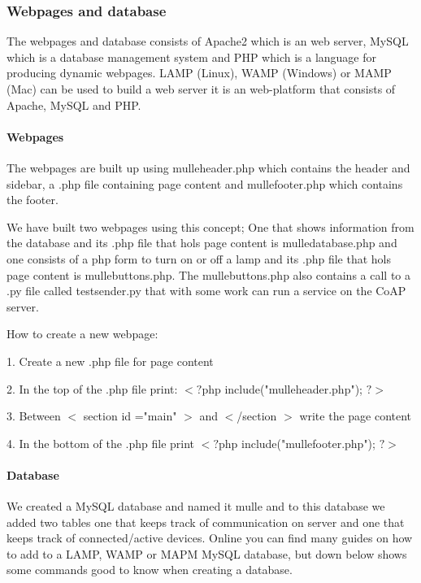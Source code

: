 \subsubsection{Webpages and database}
 
The webpages and database consists of Apache2 which is an web server, MySQL which is a database management system and PHP which is a language for producing dynamic webpages.
LAMP (Linux), WAMP (Windows) or MAMP (Mac) can be used to build a web server it is an web-platform that consists of Apache, MySQL and PHP.

\paragraph{Webpages}

The webpages are built up using mulleheader.php which contains the header and sidebar, a .php file containing page content and mullefooter.php which contains the footer.

We have built two webpages using this concept; One that shows information from the database and its .php file that hols page content is mulledatabase.php and one consists of 
a php form to turn on or off a lamp and its .php file that hols page content is mullebuttons.php. The mullebuttons.php also contains a call to a .py file called testsender.py
that with some work can run a service on the CoAP server.


How to create a new webpage:

1. 	Create a new .php file for page content

2. 	In the top of the .php file print: $<?$php include("mulleheader.php"); $?>$

3. 	Between $<$ section id ="main" $>$ and $<$/section $>$ write the page content

4. 	In the bottom of the .php file print $<?$php include("mullefooter.php"); $?>$

\paragraph{Database}

We created a MySQL database and named it mulle and to this database we added two tables one that keeps track of communication on server and one that keeps track of connected/active 
devices. Online you can find many guides on how to add to a LAMP, WAMP or MAPM MySQL database, but down below shows some commands good to know when creating a database.  


